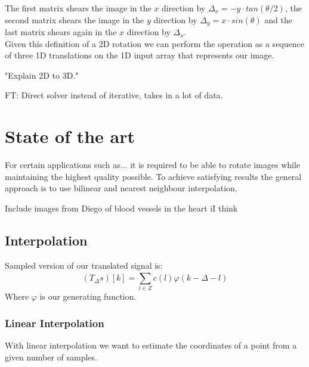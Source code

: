 \documentclass[]{usiinfbachelorproject}
\begin{document}
	The first matrix shears the image in the $x$ direction by $\Delta_x = -y\cdot tan(\theta/2)$, the second matrix shears the image in the $y$ direction by $\Delta_y = x \cdot sin(\theta)$ and the last matrix shears again in the $x$ direction by $\Delta_x$.\\
	
	Given this definition of a 2D rotation we can perform the operation as a sequence of three 1D translations on the 1D input array that represents our image.
	
	"Explain 2D to 3D."
	
	FT: Direct solver instead of iterative, takes in a lot of data.
	
	
	\section{State of the art}
	For certain applications such as... it is required to be able to rotate images while maintaining the highest quality possible. To achieve satisfying results the general approach is to use bilinear and nearest neighbour interpolation.
	
	
	Include images from Diego of blood vessels in the heart iI think
	
	
	\iffalse
	
	\subsection{Interpolation}
	Sampled version of our translated signal is:
	\begin{equation}
		(T_\Delta s)[k] = \sum_{l \in Z}^{} c(l)\varphi(k - \Delta - l)
	\end{equation}
	Where $\varphi$ is our generating function.
	\subsubsection{Linear Interpolation}
	With linear interpolation we want to estimate the coordinates of a point from a given number of samples. 
	
\end{document}
